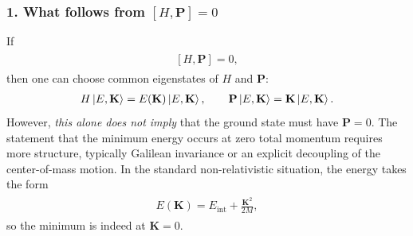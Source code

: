 \documentclass[../QFT_main.tex]{subfiles}
\begin{document}
\subsubsection*{1. What follows from $[H,\mathbf{P}]=0$}
If
{\small\begin{align}
\begin{aligned}
    [H,\mathbf{P}]=0,
\end{aligned}
\end{align}}
then one can choose common eigenstates of $H$ and $\mathbf{P}$:
{\small\begin{align}
\begin{aligned}
    H\ket{E,\mathbf{K}}=E(\mathbf{K})\ket{E,\mathbf{K}},\qquad \mathbf{P}\ket{E,\mathbf{K}}=\mathbf{K}\ket{E,\mathbf{K}}.
\end{aligned}
\end{align}}
However, \emph{this alone does not imply} that the ground state must have $\mathbf{P}=0$.
The statement that the minimum energy occurs at zero total momentum requires more structure, typically Galilean invariance or an explicit decoupling of the center-of-mass motion.
In the standard non-relativistic situation, the energy takes the form
{\small\begin{align}
\begin{aligned}
    E(\mathbf{K})=E_{\mathrm{int}}+\frac{\mathbf{K}^2}{2M},
\end{aligned}
\end{align}}
so the minimum is indeed at $\mathbf{K}=0$.
\end{document}
